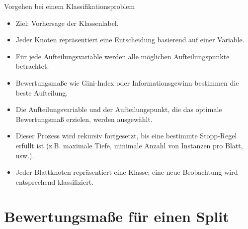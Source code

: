 \documentclass{beamer}
\begin{document}
\begin{frame}{Vorgehen bei einem Klassifikationsproblem}
	\begin{itemize}
		\item {Ziel: Vorhersage der Klassenlabel.}
		\item {Jeder Knoten repräsentiert eine Entscheidung basierend auf einer Variable.}
		\item {Für jede Aufteilungsvariable werden alle möglichen Aufteilungspunkte betrachtet.}
		\item {Bewertungsmaße wie Gini-Index oder Informationsgewinn bestimmen die beste Aufteilung.}
		\item {Die Aufteilungsvariable und der Aufteilungspunkt, die das optimale Bewertungsmaß erzielen, werden ausgewählt.}
		\item {Dieser Prozess wird rekursiv fortgesetzt, bis eine bestimmte Stopp-Regel erfüllt ist (z.B. maximale Tiefe, minimale Anzahl von Instanzen pro Blatt, usw.).}
		\item {Jeder Blattknoten repräsentiert eine Klasse; eine neue Beobachtung wird entsprechend klassifiziert.}
	\end{itemize}
\end{frame}


\section{Bewertungsmaße für einen Split}
\end{document}
